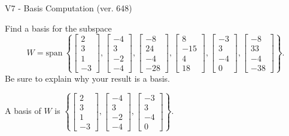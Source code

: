 \begin{exercise}
  \begin{exerciseTitle}V7 - Basis Computation (ver. 648)\end{exerciseTitle}
  \begin{exerciseStatement}
    Find a basis for the subspace 
\[W=\mathrm{span}\ \left\{\left[\begin{array}{r}
2 \\
3 \\
1 \\
-3
\end{array}\right] , \left[\begin{array}{r}
-4 \\
3 \\
-2 \\
-4
\end{array}\right] , \left[\begin{array}{r}
-8 \\
24 \\
-4 \\
-28
\end{array}\right] , \left[\begin{array}{r}
8 \\
-15 \\
4 \\
18
\end{array}\right] , \left[\begin{array}{r}
-3 \\
3 \\
-4 \\
0
\end{array}\right] , \left[\begin{array}{r}
-8 \\
33 \\
-4 \\
-38
\end{array}\right]\right\}.\]
 Be sure to explain why your result is a basis.


  \end{exerciseStatement}
  \begin{exerciseAnswer}
   A basis of \(W\) is  \(\left\{\left[\begin{array}{r}
2 \\
3 \\
1 \\
-3
\end{array}\right] , \left[\begin{array}{r}
-4 \\
3 \\
-2 \\
-4
\end{array}\right] , \left[\begin{array}{r}
-3 \\
3 \\
-4 \\
0
\end{array}\right]\right\}\).
  


  \end{exerciseAnswer}
\end{exercise}